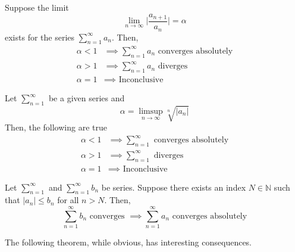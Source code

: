 \documentclass{article}
\begin{document}
    \begin{theorem}
    Suppose the limit 
    \[\lim_{n\rightarrow \infty} \bigg| \frac{a_{n+1}}{a_n} \bigg| = \alpha\]
    exists for the series $\sum_{n=1}^\infty a_n$. Then, 
    \begin{align*}
        \alpha < 1 & \implies \sum_{n=1}^\infty a_n \text{ converges absolutely} \\
        \alpha > 1 & \implies \sum_{n=1}^\infty a_n \text{ diverges} \\
        \alpha = 1 & \implies \text{ Inconclusive}
    \end{align*}
    \end{theorem}

    \begin{theorem}
    Let $\sum_{n=1}^\infty$ be a given series and 
    \[\alpha = \limsup_{n\rightarrow \infty} \sqrt[n]{|a_n|}\]
    Then, the following are true
    \begin{align*}
        \alpha < 1 & \implies \sum_{n=1}^\infty \text{ converges absolutely} \\
        \alpha > 1 & \implies \sum_{n=1}^\infty \text{ diverges} \\
        \alpha = 1 & \implies \text{ Inconclusive} 
    \end{align*}
    \end{theorem}

    \begin{theorem}
    Let $\sum_{n=1}^\infty$ and $\sum_{n=1}^\infty b_n$ be series. Suppose there exists an index $N \in \mathbb{N}$ such that $|a_n| \leq b_n$ for all $n>N$. Then, 
    \[\sum_{n=1}^\infty b_n \text{ converges } \implies \sum_{n=1}^\infty a_n \text{ converges absolutely}\]
    \end{theorem}

    The following theorem, while obvious, has interesting consequences. 
\end{document}
